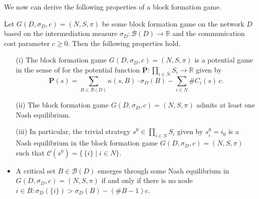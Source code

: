 We now can derive the following properties of a block formation game.
\begin{theorem}
Let $G (D, \sigma_D ,c ) = (N,S, \pi )$ be some block formation game on the network $D$ based on the intermediation measure $\sigma_D \colon \mathcal{B} (D) \to \mathbb{R}$ and the communication cost parameter $c \geqslant 0$. Then the following properties hold.
\begin{itemize}
\item[(i)] The block formation game $G (D, \sigma_D ,c ) = (N,S, \pi )$ is a potential game in the sense of \citet{MondererShapley1996} for the potential function $\mathbf{P} \colon \prod_{i \in N} S_i \to \mathbb{R}$ given by
\[
\mathbf{P} (s) = \sum_{B \in \mathcal{B} (D)} \kappa (s,B) \cdot \sigma_D (B) - \sum_{i \in N} \# C_i (s) \, c .
\]

\item[(ii)] The block formation game $G (D, \sigma_D ,c) = (N,S, \pi )$ admits at least one Nash equilibrium.

\item[(iii)] In particular, the trivial strategy $s^0 \in \prod_{i \in N} S_i$ given by $s^0_i = i_0$ is a Nash equilibrium in the block formation game $G (D, \sigma_D ,c) = (N,S, \pi )$ such that $\mathcal{C} (s^0) = \{ \, \{ i \} \mid i \in N \}$.

\item A critical set $B \in \mathcal{B} (D)$ emerges through some Nash equilibrium in $G (D, \sigma_D ,c) = (N,S, \pi )$ if and only if there is no node $i \in B \colon \sigma_D (\{ i \}) > \sigma_D (B) - (\# B -1)c$.
\end{itemize}
\end{theorem}
